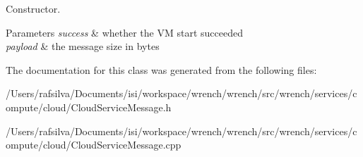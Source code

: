 Constructor. 


\begin{DoxyParams}{Parameters}
{\em success} & whether the VM start succeeded \\
\hline
{\em payload} & the message size in bytes \\
\hline
\end{DoxyParams}


The documentation for this class was generated from the following files\+:\begin{DoxyCompactItemize}
\item 
/\+Users/rafsilva/\+Documents/isi/workspace/wrench/wrench/src/wrench/services/compute/cloud/Cloud\+Service\+Message.\+h\item 
/\+Users/rafsilva/\+Documents/isi/workspace/wrench/wrench/src/wrench/services/compute/cloud/Cloud\+Service\+Message.\+cpp\end{DoxyCompactItemize}
